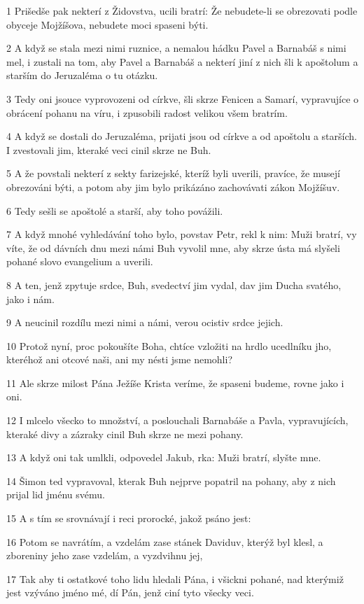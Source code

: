 \par 1 Prišedše pak nekterí z Židovstva, ucili bratrí: Že nebudete-li se obrezovati podle obyceje Mojžíšova, nebudete moci spaseni býti.
\par 2 A když se stala mezi nimi ruznice, a nemalou hádku Pavel a Barnabáš s nimi mel, i zustali na tom, aby Pavel a Barnabáš a nekterí jiní z nich šli k apoštolum a starším do Jeruzaléma o tu otázku.
\par 3 Tedy oni jsouce vyprovozeni od církve, šli skrze Fenicen a Samarí, vypravujíce o obrácení pohanu na víru, i zpusobili radost velikou všem bratrím.
\par 4 A když se dostali do Jeruzaléma, prijati jsou od církve a od apoštolu a starších. I zvestovali jim, kteraké veci cinil skrze ne Buh.
\par 5 A že povstali nekterí z sekty farizejské, kteríž byli uverili, pravíce, že musejí obrezováni býti, a potom aby jim bylo prikázáno zachovávati zákon Mojžíšuv.
\par 6 Tedy sešli se apoštolé a starší, aby toho povážili.
\par 7 A když mnohé vyhledávání toho bylo, povstav Petr, rekl k nim: Muži bratrí, vy víte, že od dávních dnu mezi námi Buh vyvolil mne, aby skrze ústa má slyšeli pohané slovo evangelium a uverili.
\par 8 A ten, jenž zpytuje srdce, Buh, svedectví jim vydal, dav jim Ducha svatého, jako i nám.
\par 9 A neucinil rozdílu mezi nimi a námi, verou ocistiv srdce jejich.
\par 10 Protož nyní, proc pokoušíte Boha, chtíce vzložiti na hrdlo ucedlníku jho, kteréhož ani otcové naši, ani my nésti jsme nemohli?
\par 11 Ale skrze milost Pána Ježíše Krista veríme, že spaseni budeme, rovne jako i oni.
\par 12 I mlcelo všecko to množství, a poslouchali Barnabáše a Pavla, vypravujících, kteraké divy a zázraky cinil Buh skrze ne mezi pohany.
\par 13 A když oni tak umlkli, odpovedel Jakub, rka: Muži bratrí, slyšte mne.
\par 14 Šimon ted vypravoval, kterak Buh nejprve popatril na pohany, aby z nich prijal lid jménu svému.
\par 15 A s tím se srovnávají i reci prorocké, jakož psáno jest:
\par 16 Potom se navrátím, a vzdelám zase stánek Daviduv, kterýž byl klesl, a zboreniny jeho zase vzdelám, a vyzdvihnu jej,
\par 17 Tak aby ti ostatkové toho lidu hledali Pána, i všickni pohané, nad kterýmiž jest vzýváno jméno mé, dí Pán, jenž ciní tyto všecky veci.
